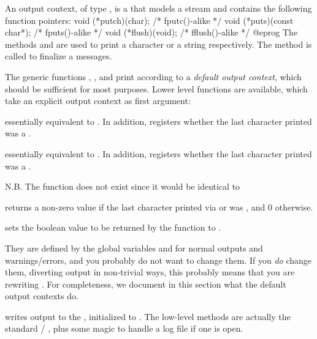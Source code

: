 
An output coutext, of type , is a 
that models a stream and contains the following function pointers:
\bprog
void (*putch)(char);           /* fputc()-alike */
void (*puts)(const char*);     /* fputs()-alike */
void (*flush)(void);           /* fflush()-alike */
@eprog\noindent
The methods  and  are used to print a character
or a string respectively.  The method  is called to finalize a
messages.

The generic functions , ,  and
 print according to a \emph{default output context}, which
should be sufficient for most purposes. Lower level functions are available,
which take an explicit output context as first argument:

 essentially equivalent to
. In addition, registers whether the last character printed
was a .

 essentially equivalent to
. In addition, registers whether the last character printed
was a .



\noindent N.B. The function  does not exist since it would be
identical to 

 returns a non-zero value if the last
character printed via  or  was , and $0$ otherwise.

 sets the boolean value
to be returned by the function  to .

 They are defined by the global variables
 and  for normal outputs and warnings/errors, and you
probably do not want to change them. If you \emph{do} change them, diverting
output in non-trivial ways, this probably means that you are rewriting
. For completeness, we document in this section what the default
output contexts do.

 writes output to the  ,
initialized to .  The low-level methods are actually the standard
 / , plus some magic to handle a log file if one is
open.

